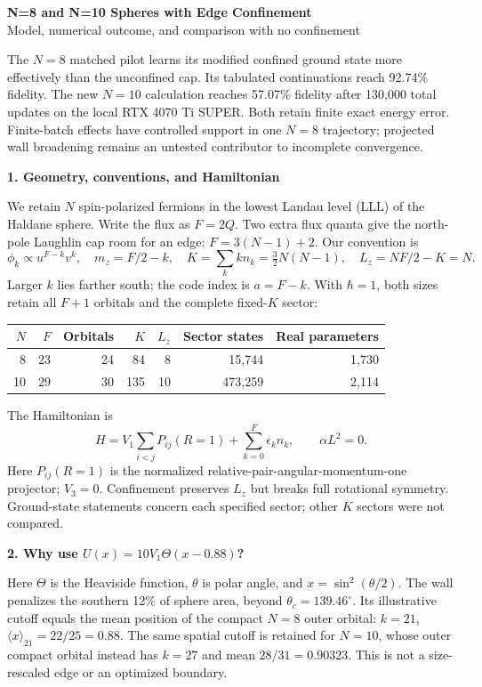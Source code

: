 \documentclass[10pt,letterpaper]{article}
\newcommand{\topic}[1]{\vspace{3pt}\textbf{\color{ink}#1}\par}
\newcommand{\V}{V_1}
\begin{document}
\begin{center}
{\Large\bfseries N=8 and N=10 Spheres with Edge Confinement}\\[3pt]
{\large Model, numerical outcome, and comparison with no confinement}
\end{center}

The $N=8$ matched pilot learns its modified confined ground state more effectively than the unconfined cap. Its tabulated continuations reach 92.74\% fidelity. The new $N=10$ calculation reaches 57.07\% fidelity after 130,000 total updates on the local RTX 4070 Ti SUPER. Both retain finite exact energy error. Finite-batch effects have controlled support in one $N=8$ trajectory; projected wall broadening remains an untested contributor to incomplete convergence.

\topic{1. Geometry, conventions, and Hamiltonian}
We retain $N$ spin-polarized fermions in the lowest Landau level (LLL) of the Haldane sphere. Write the flux as $F=2Q$. Two extra flux quanta give the north-pole Laughlin cap room for an edge: $F=3(N-1)+2$. Our convention is
\[
 \phi_k\propto u^{F-k}v^k,\quad m_z=F/2-k,\quad
 K=\sum_k k n_k=\tfrac32N(N-1),\quad L_z=NF/2-K=N.
\]
Larger $k$ lies farther south; the code index is $a=F-k$. With $\hbar=1$, both sizes retain all $F+1$ orbitals and the complete fixed-$K$ sector:
\begin{center}\small
\begin{tabular}{@{}rrrrrrr@{}}\toprule
$N$ & $F$ & Orbitals & $K$ & $L_z$ & Sector states & Real parameters\\\midrule
8 & 23 & 24 & 84 & 8 & 15,744 & 1,730\\
10 & 29 & 30 & 135 & 10 & 473,259 & 2,114\\\bottomrule
\end{tabular}
\end{center}
The Hamiltonian is
\begin{equation}
 H=\V\sum_{i<j}P_{ij}(R=1)+\sum_{k=0}^{F}\epsilon_k n_k,
 \qquad \alpha L^2=0.
 \label{eq:H}
\end{equation}
Here $P_{ij}(R=1)$ is the normalized relative-pair-angular-momentum-one projector; $V_3=0$. Confinement preserves $L_z$ but breaks full rotational symmetry. Ground-state statements concern each specified sector; other $K$ sectors were not compared.

\topic{2. Why use $U(x)=10\V\Theta(x-0.88)$?}
Here $\Theta$ is the Heaviside function, $\theta$ is polar angle, and $x=\sin^2(\theta/2)$. The wall penalizes the southern 12\% of sphere area, beyond $\theta_c=139.46^\circ$. Its illustrative cutoff equals the mean position of the compact $N=8$ outer orbital: $k=21$, $\langle x\rangle_{21}=22/25=0.88$. The same spatial cutoff is retained for $N=10$, whose outer compact orbital instead has $k=27$ and mean $28/31=0.90323$. This is not a size-rescaled edge or an optimized boundary.
\end{document}
